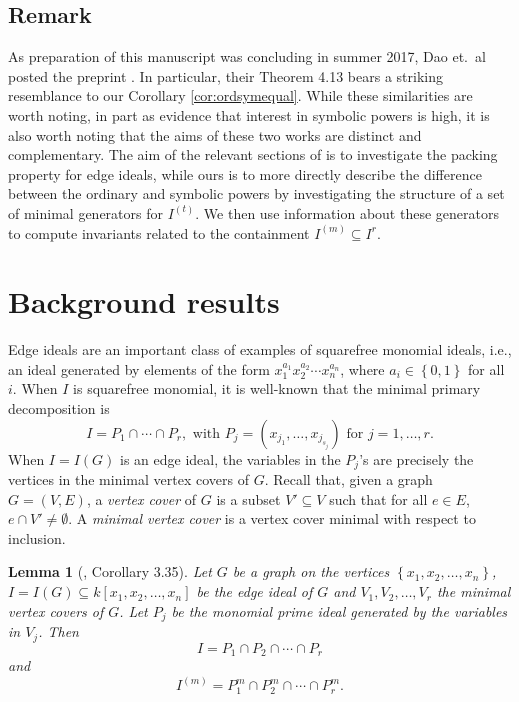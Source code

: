 \documentclass[12pt]{amsart}
\def\set#1{\left\{ {#1} \right\}}
\theoremstyle{plain}
\newtheorem{lem}[theorem]{Lemma}
\theoremstyle{definition}
\begin{document}
\subsection*{Remark}
	As preparation of this manuscript was concluding in summer 2017, Dao et.~al posted the preprint \cite{2017DaoEtAl}.
	In particular, their Theorem 4.13 bears a striking resemblance to our Corollary \ref{cor:ordsymequal}. 
	While these similarities are worth noting, in part as evidence that interest in symbolic powers is high, it is also worth noting that the aims of these two works are distinct and complementary. 
	The aim of the relevant sections of  \cite{2017DaoEtAl} is to investigate the packing property for edge ideals, while ours is to more directly describe the difference between the ordinary and symbolic powers by investigating the structure of a set of minimal generators for $I^{(t)}$.
	We then use information about these generators to compute invariants related to the containment $I^{(m)}\subseteq I^r$.











\section{Background results}


Edge ideals are an important class of examples of squarefree monomial ideals, i.e., an ideal generated by elements of the form $x_1^{a_1} x_2^{a_2} \cdots x_n^{a_n}$, where $a_i \in \set{0,1}$ for all $i$.
When $I$ is squarefree monomial, it is well-known that the minimal primary decomposition is
\[
	I = P_1 \cap \cdots \cap P_r, \text{ with } P_j = (x_{j_1}, \ldots, x_{j_{s_j}}) \text{ for } j = 1, \ldots, r.
\]
When $I = I(G)$ is an edge ideal, the variables in the $P_j$'s are precisely the vertices in the minimal vertex covers of $G$.
Recall that, given a graph $G = (V,E)$, a \emph{vertex cover} of $G$ is a subset $V'\subseteq V$ such that for all $e\in E$, $e\cap V' \ne \emptyset$.
A \emph{minimal vertex cover} is a vertex cover minimal with respect to inclusion.



\begin{lem}[\cite{VanTuyl2013}, Corollary 3.35]\label{lem:minprimevertexcover}
	Let $G$ be a graph on the vertices $\set{x_1,x_2,\ldots,x_n}$, $I = I(G) \subseteq k[x_1,x_2,\ldots,x_n]$ be the edge ideal of $G$ and $V_1, V_2, \ldots, V_r$ the minimal vertex covers of $G$.
	Let $P_j$ be the monomial prime ideal generated by the variables in $V_j$.
	Then
	\[
		I = P_1 \cap P_2 \cap \cdots \cap P_r
	\]
	and
	\[
		I^{(m)} = P_1^m \cap P_2^m \cap \cdots \cap P_r^m.
	\]
\end{lem}
\end{document}
